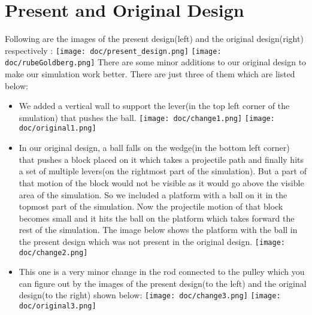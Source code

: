 \documentclass[english]{article}
\begin{document}
\section{Present and Original Design}
Following are the images of the present design(left) and the original design(right) respectively :
\newline
\newline
\texttt{[image: doc/present\_design.png]}
\texttt{[image: doc/rubeGoldberg.png]}
\newline
There are some minor additions to our original design to make our simulation work better. There are just three of them which are listed below:
\begin{itemize}
\item We added a vertical wall to support the lever(in the top left corner of the smulation) that pushes the ball.
\newline
\texttt{[image: doc/change1.png]}
\texttt{[image: doc/original1.png]}
\item In our original design, a ball falls on the wedge(in the bottom left corner) that pushes a block placed on it which takes a projectile path and finally hits a set of multiple levers(on the rightmost part of the simulation). But a part of that motion of the block would not be visible as it would go above the visible area of the simulation. So we included a platform with a ball on it in the topmost part of the simulation. Now the projectile motion of that block becomes small and it hits the ball on the platform which takes forward the rest of the simulation. The image below shows the platform with the ball in the present design which was not present in the original design.
\newline
\texttt{[image: doc/change2.png]}
\item This one is a very minor change in the rod connected to the pulley which you can figure out by the images of the present design(to the left) and the original design(to the right) shown below:
\newline
\texttt{[image: doc/change3.png]}
\texttt{[image: doc/original3.png]}
\newline
\end{itemize}
\end{document}
